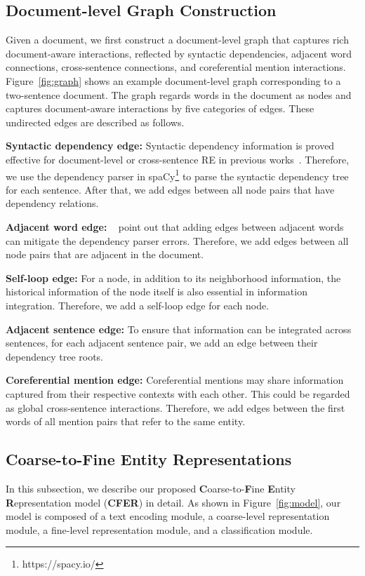 \documentclass{article}
\newcommand{\citep}{\cite}
\newcommand{\citet}[1]{\citeauthor{#1}~\shortcite{#1}}
\begin{document}
\subsection{Document-level Graph Construction}
Given a document, we first construct a document-level graph that captures rich document-aware interactions, reflected by syntactic dependencies, adjacent word connections, cross-sentence connections, and coreferential mention interactions. 
Figure~\ref{fig:graph} shows an example document-level graph corresponding to a two-sentence document. 
The graph regards words in the document as nodes and captures document-aware interactions by five categories of edges. 
These undirected edges are described as follows. 

\noindent\textbf{Syntactic dependency edge:}
Syntactic dependency information is proved effective for document-level or cross-sentence RE in previous works~\citep{gcnn}. 
Therefore, we use the dependency parser in spaCy\footnote{https://spacy.io/} to parse the syntactic dependency tree for each sentence. 
After that, we add edges between all node pairs that have dependency relations. 

\noindent\textbf{Adjacent word edge:}
\citet{quirk_and_poon} point out that adding edges between adjacent words can mitigate the dependency parser errors.
Therefore, we add edges between all node pairs that are adjacent in the document. 

\noindent\textbf{Self-loop edge:}
For a node, in addition to its neighborhood information, the historical information of the node itself is also essential in information integration. 
Therefore, we add a self-loop edge for each node. 

\noindent\textbf{Adjacent sentence edge:}
To ensure that information can be integrated across sentences, for each adjacent sentence pair, we add an edge between their dependency tree roots. 

\noindent\textbf{Coreferential mention edge:}
Coreferential mentions may share information captured from their respective contexts with each other. 
This could be regarded as global cross-sentence interactions. 
Therefore, we add edges between the first words of all mention pairs that refer to the same entity. 

\subsection{Coarse-to-Fine Entity Representations}

In this subsection, we describe our proposed \textbf{C}oarse-to-\textbf{F}ine \textbf{E}ntity \textbf{R}epresentation model (\textbf{CFER}) in detail. 
As shown in Figure~\ref{fig:model}, our model is composed of a text encoding module, a coarse-level representation module, a fine-level representation module, and a classification module.  
\end{document}
